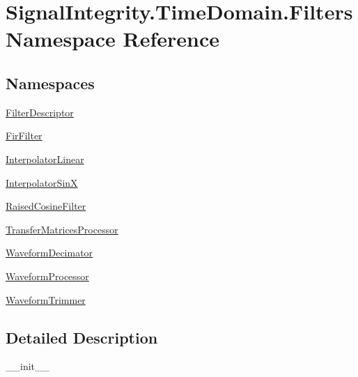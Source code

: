 \hypertarget{namespaceSignalIntegrity_1_1TimeDomain_1_1Filters}{}\section{Signal\+Integrity.\+Time\+Domain.\+Filters Namespace Reference}
\label{namespaceSignalIntegrity_1_1TimeDomain_1_1Filters}
\subsection*{Namespaces}
\begin{DoxyCompactItemize}
\item 
 \hyperlink{namespaceSignalIntegrity_1_1TimeDomain_1_1Filters_1_1FilterDescriptor}{Filter\+Descriptor}
\item 
 \hyperlink{namespaceSignalIntegrity_1_1TimeDomain_1_1Filters_1_1FirFilter}{Fir\+Filter}
\item 
 \hyperlink{namespaceSignalIntegrity_1_1TimeDomain_1_1Filters_1_1InterpolatorLinear}{Interpolator\+Linear}
\item 
 \hyperlink{namespaceSignalIntegrity_1_1TimeDomain_1_1Filters_1_1InterpolatorSinX}{Interpolator\+SinX}
\item 
 \hyperlink{namespaceSignalIntegrity_1_1TimeDomain_1_1Filters_1_1RaisedCosineFilter}{Raised\+Cosine\+Filter}
\item 
 \hyperlink{namespaceSignalIntegrity_1_1TimeDomain_1_1Filters_1_1TransferMatricesProcessor}{Transfer\+Matrices\+Processor}
\item 
 \hyperlink{namespaceSignalIntegrity_1_1TimeDomain_1_1Filters_1_1WaveformDecimator}{Waveform\+Decimator}
\item 
 \hyperlink{namespaceSignalIntegrity_1_1TimeDomain_1_1Filters_1_1WaveformProcessor}{Waveform\+Processor}
\item 
 \hyperlink{namespaceSignalIntegrity_1_1TimeDomain_1_1Filters_1_1WaveformTrimmer}{Waveform\+Trimmer}
\end{DoxyCompactItemize}


\subsection{Detailed Description}
\begin{DoxyVerb}__init__\end{DoxyVerb}
 